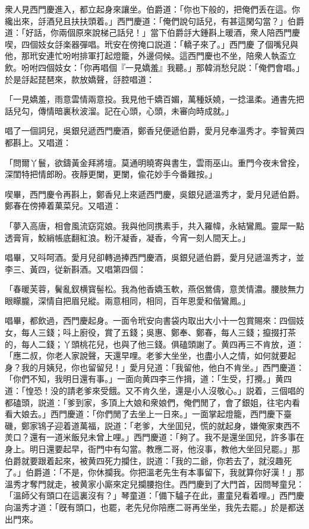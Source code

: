 衆人見西門慶進入，都立起身來讓坐。伯爵道：「你也下般的，把俺們丢在這。你纔出來，㧱酒兒且扶扶頭着。」西門慶道：「俺們說句話兒，有甚這閑勾當？」伯爵道：「好話，你兩個原來說梯己話兒！」當下伯爵㧱大鍾斟上暖酒，衆人陪西門慶喫，四個妓女㧱楽器彈唱。玳安在傍掩口説道：「轎子來了。」西門慶𢫓了個嘴兒與他，那玳安連忙吩咐排軍打起燈籠，外邊伺候。這西門慶也不坐，陪衆人執盃立飲。吩咐四個妓女：「你再唱個『一見嬌羞』我聽。」那韓消愁兒説：「俺們會唱。」於是㧱起琵琶來，款放嬌聲，㧱腔唱道：

\begin{myquote}
「一見嬌羞，雨意雲情兩意投。我見他千嬌百媚，萬種妖嬈，一捻溫柔。通書先把話兒勾，傳情暗裏秋波溜。記在心頭，心頭，未審向時成就。」
\end{myquote}

唱了一個詞兒，吳銀兒遞西門慶酒，鄭香兒便遞伯爵，愛月兒奉溫秀才。李智黄四都斟上。又唱道：

\begin{myquote}
「問爾丫鬟，欲鑄黃金拜將壇。莫通明曉寄與書生，雲雨巫山。重門今夜未曾拴，深閨特把情郎盼。夜靜更闌，更闌，偸花妙手今番難按。」
\end{myquote}

喫畢，西門慶令再斟上，鄭香兒上來遞西門慶，吳銀兒遞溫秀才，愛月兒遞伯爵。鄭春在傍捧着菓菜兒。又唱道：

\begin{myquote}
「夢入高唐，相會風流窈窕娘。我與他同携素手，共入羅幃，永結鸞鳳。靈犀一點透膏肓，鮫綃帳底翻紅浪。粉汗凝香，凝香，今宵一刻人間天上。」
\end{myquote}

唱畢，又呌呵酒。愛月兒卻轉過捧西門慶酒，吳銀兒遞伯爵，愛月兒遞溫秀才，並李三、黃四，従新斟酒。又唱第四個：

\begin{myquote}
「春暖芙蓉，鬢亂釵横寳髻松。我為他香嬌玉軟，燕侶鶯儔，意羙情濃。腰肢無力眼矇朧，深情自把眉兒縱。兩意相同，相同，百年恩愛和偕鸞鳳。」
\end{myquote}

唱畢，都飲過，西門慶起身。一面令玳安向書袋内取出大小十一包賞賜來：四個妓女，每人三錢；呌上廚役，賞了五錢；吳惠、鄭奉、鄭春，每人三錢；攛掇打茶的，每人二錢；丫頭桃花兒，也與了他三錢。俱磕頭謝了。黄四再三不肯放，道：「應二叔，你老人家說聲，天還早哩。老爹大坐坐，也盡小人之情，如何就要起身？我的月姨兒，你也留留兒！」愛月兒道：「我留他，他白不肯坐。」西門慶道：「你們不知，我明日還有事。」一面向黄四李三作揖，道：「生受，打攪。」黄四道：「惶恐！没的請老爹來受餓。又不肯久坐，還是小人沒敬心。」説着，三個唱的都磕頭，説道：「爹到家，多頂上大娘和衆娘們，俺們閒了，會了銀姐，往宅内看看大娘去。」西門慶道：「你們閒了去坐上一日來。」一面掌起燈籠，西門慶下臺磯，鄭家鴇子迎着道萬福，説道：「老爹，大坐囬兒，慌的就起身，嫌俺家東西不羙口？還有一道米飯兒未曾上哩。」西門慶道：「夠了。我不是還坐囬兒，許多事在身上。明日還要起早，衙門中有勾當。教應二哥，他沒事，教他大坐回兒罷。」那伯爵就要跟着起來，被黄四死力攔住，説道：「我的二爺，你若去了，就沒趣死了。」伯爵道：「不是，你休攔我。你把溫老先生有本事留下，我就算你好漢！」那溫秀才奪門就走，被黄家小廝來定兒攔腰抱住。西門慶到了大門首，因問琴童兒：「溫師父有頭口在這裏沒有？」琴童道：「備下驢子在此，畫童兒看着哩。」西門慶向溫秀才道：「旣有頭口，也罷，老先兒你陪應二哥再坐坐，我先去罷。」於是都送出門來。

